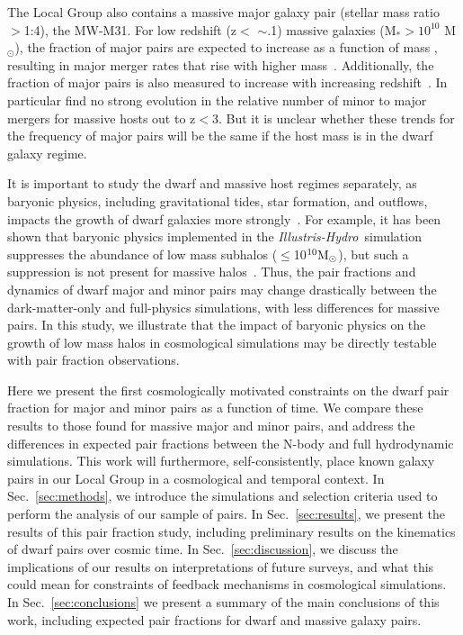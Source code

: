 \documentclass[twocolumn]{aastex63}
\newcommand\msun{\rm{M}_{\odot}}
\newcommand\IH{\textit{Illustris-Hydro}}
\begin{document}
The Local Group also contains a massive major galaxy pair (stellar mass ratio $>$1:4), the MW-M31. For low redshift (z$<$ $\sim$.1) massive galaxies (M$_\ast > 10^{10}$ M$_\odot$), the fraction of major pairs are expected to increase as a function of mass \citep{casteels14}, resulting in major merger rates that rise  with higher mass~\citep{rg15,ventou17,oleary21b}. Additionally, the fraction of major pairs is also measured to increase with increasing redshift~\citep{deravel09,bundy09,duncan19}. In particular \citet{duncan19} find no strong evolution in the relative number of minor to major mergers for massive hosts out to z$<$3. But it is unclear whether these trends for the frequency of major pairs will be the same if the host mass is in the dwarf galaxy regime. 

It is important to study the dwarf and massive host regimes separately, as baryonic physics, including gravitational tides, star formation, and outflows, impacts the growth of dwarf galaxies more strongly~\citep{bullockbk17,jeon19,jeon21}. For example, it has been shown that baryonic physics implemented in the \IH\ simulation suppresses the abundance of low mass subhalos ($\leq$10$^{10}\msun$), but such a suppression is not present for massive halos~\citep{chua17}. Thus, the pair fractions and dynamics of dwarf major and minor pairs may change drastically between the dark-matter-only and full-physics simulations, with less differences for massive  pairs. In this study, we illustrate that the impact of baryonic physics on the growth of low mass halos in cosmological simulations may be directly testable with pair fraction observations. 

Here we present the first cosmologically motivated constraints on the dwarf pair fraction for major and minor pairs as a function of time. We compare these results to those found for massive major and minor pairs, and address the differences in expected pair fractions between the N-body and full hydrodynamic simulations. This work will furthermore, self-consistently, place known galaxy pairs in our Local Group in a cosmological and temporal context.  In Sec.~\ref{sec:methods}, we introduce the simulations and selection criteria used to perform the analysis of our sample of pairs. In Sec.~\ref{sec:results}, we present the results of this pair fraction study, including preliminary results on the kinematics of dwarf pairs over cosmic time. In Sec.~\ref{sec:discussion}, we discuss the implications of our results on interpretations of future surveys, and what this could mean for constraints of feedback mechanisms in cosmological simulations. In Sec.~\ref{sec:conclusions} we present a summary of the main conclusions of this work, including expected pair fractions for dwarf and massive galaxy pairs.
\end{document}
